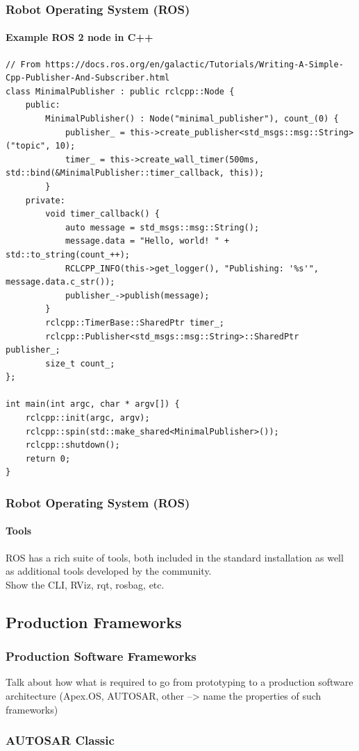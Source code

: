 \begin{frame}[fragile]
\frametitle{Robot Operating System (ROS)}
\framesubtitle{Example ROS 2 node in C++}
\tiny
\begin{verbatim}
// From https://docs.ros.org/en/galactic/Tutorials/Writing-A-Simple-Cpp-Publisher-And-Subscriber.html
class MinimalPublisher : public rclcpp::Node {
    public:
        MinimalPublisher() : Node("minimal_publisher"), count_(0) {
            publisher_ = this->create_publisher<std_msgs::msg::String>("topic", 10);
            timer_ = this->create_wall_timer(500ms, std::bind(&MinimalPublisher::timer_callback, this));
        }
    private:
        void timer_callback() {
            auto message = std_msgs::msg::String();
            message.data = "Hello, world! " + std::to_string(count_++);
            RCLCPP_INFO(this->get_logger(), "Publishing: '%s'", message.data.c_str());
            publisher_->publish(message);
        }
        rclcpp::TimerBase::SharedPtr timer_;
        rclcpp::Publisher<std_msgs::msg::String>::SharedPtr publisher_;
        size_t count_;
};

int main(int argc, char * argv[]) {
    rclcpp::init(argc, argv);
    rclcpp::spin(std::make_shared<MinimalPublisher>());
    rclcpp::shutdown();
    return 0;
}
\end{verbatim}
\end{frame}

\begin{frame}
\frametitle{Robot Operating System (ROS)}
\framesubtitle{Tools}
ROS has a rich suite of tools, both included in the standard installation as
well as additional tools developed by the community.\\
Show the CLI, RViz, rqt, rosbag, etc.
\end{frame}

\subsection{Production Frameworks}

\begin{frame}
\frametitle{Production Software Frameworks}
Talk about how what is required to go from prototyping to a production
software architecture (Apex.OS, AUTOSAR, other --> name the properties
of such frameworks)
\end{frame}

\begin{frame}
\frametitle{AUTOSAR Classic}
\end{frame}

